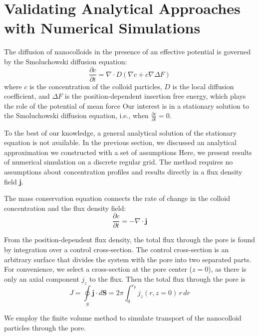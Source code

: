 \documentclass[10pt, a4paper]{article}
\begin{document}
\section{Validating Analytical Approaches with Numerical Simulations}

\begin{multicols}{2}
The diffusion of nanocolloids in the presence of an effective potential is governed by the Smoluchowski diffusion equation:
\begin{equation}
    \label{eq:Smoluchowski}
    \frac{\partial c}{\partial t} = \nabla \cdot D(\nabla c + c \nabla \Delta F)
\end{equation}
where $c$ is the concentration of the colloid particles, $D$ is the local diffusion coefficient, and $\Delta F$ is the position-dependent insertion free energy, which plays the role of the potential of mean force
Our interest is in a stationary solution to the Smoluchowski diffusion equation, i.e., when $\frac{\partial c}{\partial t} = 0$.

To the best of our knowledge, a general analytical solution of the stationary equation is not available.
In the previous section, we discussed an analytical approximation we constructed with a set of assumptions
Here, we present results of numerical simulation on a discrete regular grid.
The method requires no assumptions about concentration profiles and results directly in a flux density field $\bm{j}$.

The mass conservation equation connects the rate of change in the colloid concentration and the flux density field:
\begin{equation}
    \frac{\partial c}{\partial t} = -\nabla \cdot \bm{j}
\end{equation}

From the position-dependent flux density, the total flux through the pore is found by integration over a control cross-section.
The control cross-section is an arbitrary surface that divides the system with the pore into two separated parts.
For convenience, we select a cross-section at the pore center ($z = 0$), as there is only an axial component $j_z$ to the flux.
Then the total flux through the pore is
\begin{equation}
    \label{eq:total_flux_1}
    J = \oint\limits_{S} \bm{j} \cdot d\bm{S} = 2 \pi \int_0^{r_{\text{p}}} j_z(r, z = 0) \, r \, dr
\end{equation}

We employ the finite volume method to simulate transport of the nanocolloid particles through the pore.


\end{multicols}
\end{document}

